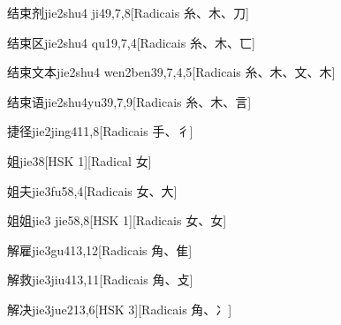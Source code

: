 \begin{entry}{结束剂}{jie2shu4 ji4}{9,7,8}[Radicais ⽷、⽊、⼑]
\end{entry}

\begin{entry}{结束区}{jie2shu4 qu1}{9,7,4}[Radicais ⽷、⽊、⼖]
\end{entry}

\begin{entry}{结束文本}{jie2shu4 wen2ben3}{9,7,4,5}[Radicais ⽷、⽊、⽂、⽊]
\end{entry}

\begin{entry}{结束语}{jie2shu4yu3}{9,7,9}[Radicais ⽷、⽊、⾔]
\end{entry}

\begin{entry}{捷径}{jie2jing4}{11,8}[Radicais ⼿、⼻]
\end{entry}

\begin{entry}{姐}{jie3}{8}[HSK 1][Radical ⼥]
\end{entry}

\begin{entry}{姐夫}{jie3fu5}{8,4}[Radicais ⼥、⼤]
\end{entry}

\begin{entry}{姐姐}{jie3 jie5}{8,8}[HSK 1][Radicais ⼥、⼥]
\end{entry}

\begin{entry}{解雇}{jie3gu4}{13,12}[Radicais ⾓、⾫]
\end{entry}

\begin{entry}{解救}{jie3jiu4}{13,11}[Radicais ⾓、⽁]
\end{entry}

\begin{entry}{解决}{jie3jue2}{13,6}[HSK 3][Radicais ⾓、⼎]
\end{entry}

